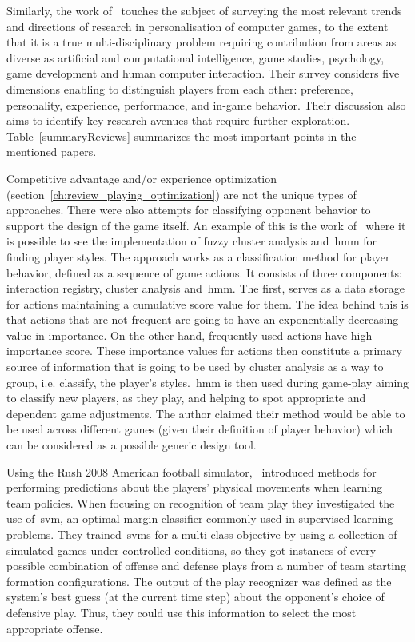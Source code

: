 Similarly, the work of~\cite{karpinskyj_video_2014} touches the subject of surveying the most relevant trends and directions of research in personalisation of computer games, to the extent that it is a true multi-disciplinary problem requiring contribution from areas as diverse as artificial and computational intelligence, game studies, psychology, game development and human computer interaction. Their survey considers five dimensions enabling to distinguish players from each other: preference, personality, experience, performance, and in-game behavior. Their discussion also aims to identify key research avenues that require further exploration. Table~\ref{summaryReviews} summarizes the most important points in the mentioned papers. 

Competitive advantage and/or experience optimization (section~\ref{ch:review_playing_optimization}) 
are not the unique types of approaches. There were also attempts for classifying opponent behavior to support the design of the game itself. An example of this is the work of~\cite{etheredge_generic_2013} where it is possible to see the implementation of fuzzy cluster analysis and~\gls{hmm} for finding player styles. %
The approach works as a classification method for player behavior, defined as a sequence of game actions. It consists of three components: interaction registry, cluster analysis and~\gls{hmm}. The first, serves as a data storage for actions maintaining a cumulative score value for them. The idea behind this is that actions that are not frequent are going to have an exponentially decreasing value in importance. On the other hand, frequently used actions have high importance score. These importance values for actions then constitute a primary source of information that is going to be used by cluster analysis as a way to group, i.e. classify, the player's styles.~\gls{hmm} is then used during game-play aiming to classify new players, as they play, and helping to spot appropriate and dependent game adjustments. The author claimed their method would be able to be used across different games (given their definition of player behavior) which can be considered as a possible generic design tool.

Using the Rush 2008 American football simulator,~\cite{laviersa_using_2014} introduced methods for performing predictions about the players' physical movements when learning team policies. When focusing on recognition of team play they investigated the use of~\gls{svm}, an optimal margin classifier commonly used in supervised learning problems. They trained~\gls{svm}s for a multi-class objective by using a collection of simulated games under controlled conditions, so they got instances of every possible combination of offense and defense plays from a number of team starting formation configurations. The output of the play recognizer was defined as the system's best guess (at the current time step) about the opponent's choice of defensive play. Thus, they could use this information to select the most appropriate offense.

